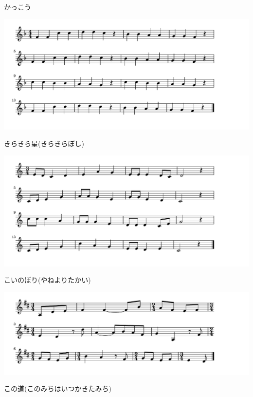 \documentclass[a4paper]{ltjsarticle}
\begin{document}
\vspace{-10mm} \hspace{10mm}
かっこう



\includegraphics[clip]{kirakira_crop.pdf}

\vspace{-10mm} \hspace{10mm}
きらきら星(きらきらぼし)



\includegraphics[clip]{koinobori_crop.pdf}

\vspace{-10mm} \hspace{10mm}
こいのぼり(やねよりたかい)



\includegraphics[clip]{konomichi_crop.pdf}

\vspace{-10mm} \hspace{10mm}
この道(このみちはいつかきたみち)
\end{document}
